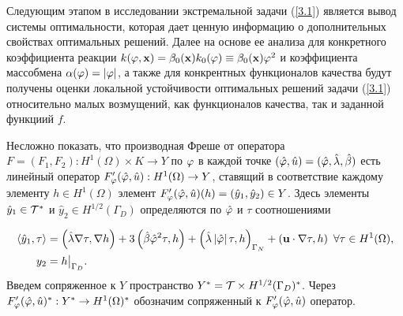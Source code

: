 

Следующим этапом в исследовании экстремальной задачи (\ref{3.1}) является вывод системы оптимальности, которая дает ценную информацию о дополнительных свойствах оптимальных решений. Далее на основе ее анализа для конкретного коэффициента реакции 
$k(\varphi, \mathbf{x}) = 
	\beta_0 (\mathbf{x}) k_0 (\varphi) \equiv 
	\beta_0 (\mathbf{x}) \varphi^2
$ и коэффициента массобмена $\alpha (\varphi) = \left\vert \varphi \right\vert$, а также для конкрентных функционалов качества будут получены оценки локальной устойчивости оптимальных решений задачи (\ref{3.1}) относительно малых возмущений, как функционалов качества, так и заданной функциий $f$.

Несложно показать, что производная Фреше от оператора 
$ F = (F_1,F_2): H^1 (\Omega) \times K \to Y $ 
по $\varphi$ в каждой точке 
$(\hat {\varphi}, \hat u) = (\hat {\varphi}, \hat \lambda, \hat \beta)$ 
есть линейный оператор 
$F'_\varphi (\hat {\varphi}, \hat u): H^1 (\Omega) \to Y$, 
ставящий в соответствие каждому элементу $h \in H^1 (\Omega)$ элемент 
$F'_\varphi (\hat {\varphi}, \hat u)(h) = (\hat y_1, \hat y_2) \in Y$. 
Здесь элементы 
$\hat y_1 \in {\mathcal{T}}^*$ и $\hat y_2 \in H^{1/2} (\Gamma_D)$ 
определяются по $\hat {\varphi}$ и $\tau$ соотношениями

\begin{equation}
	\label{os1}
	\begin{split}
		\left\langle \hat y_1, \tau \right\rangle &= 
		\left( \hat \lambda  \nabla \tau, \nabla h \right) + 3 \left( \hat \beta \hat {\varphi}^2 \tau, h \right) + 
		\left( \hat \lambda \left\vert \hat {\varphi} \right\vert \tau, h \right)_{\Gamma_N} +
		\left( \mathbf{u} \cdot \nabla \tau, h \right) ~ \forall \tau \in H^1 (\Omega), \\
		y_2 &= h\bigl. \bigr\vert_{\Gamma_D}.
	\end{split}
\end{equation}
Введем сопряженное к $Y$ пространство $Y^{*} = {\mathcal{T}} \times H^{1/2} (\Gamma_D)^{*}$. Через $F'_\varphi (\hat {\varphi}, \hat u)^{*}: Y^{*} \to H^1 (\Omega)^{*}$ обозначим сопряженный к $F'_\varphi (\hat {\varphi}, \hat u)$ оператор.

